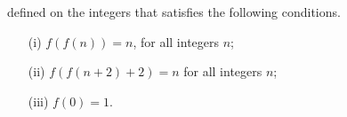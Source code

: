 defined on the integers that satisfies the following conditions.
\begin{itemize}
\item[(i)] $f(f(n)) = n$, for all integers $n$;
\item[(ii)] $f(f(n+2)+2) = n$ for all integers $n$;
\item[(iii)] $f(0) = 1$.
\end{itemize}
